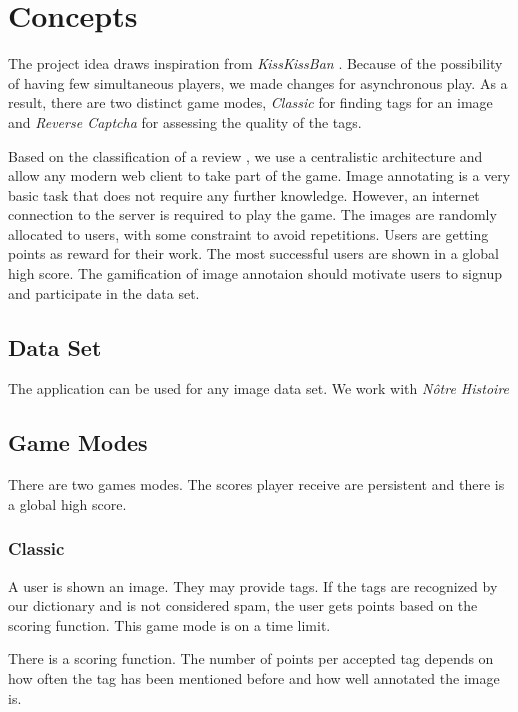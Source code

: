 \section{Concepts}
\label{g14:sec:concepts} %

The project idea draws inspiration from \textit{KissKissBan} \cite{10.1145/1600150.1600153}.
Because of the possibility of having few simultaneous players, we made changes for asynchronous play. As a result, there are two distinct game modes, \emph{Classic} for finding tags for an image and \emph{Reverse Captcha} for assessing the quality of the tags.

Based on the classification of a review \cite{8566148}, we use a centralistic architecture and allow any modern web client to take part of the game. Image annotating is a very basic task that does not require any further knowledge. However, an internet connection to the server is required to play the game. The images are randomly allocated to users, with some constraint to avoid repetitions.
Users are getting points as reward for their work. The most successful users are shown in a global high score. The gamification of image annotaion should motivate users to signup and participate in the data set.


\subsection{Data Set}
\label{g14:sec:concepts:dataset}
The application can be used for any image data set. We work with \textit{Nôtre Histoire}

\subsection{Game Modes}
\label{g14:sec:concepts:gamemodes}

There are two games modes. The scores player receive are persistent and there is a global high score. 

\subsubsection{Classic}
\label{g14:sec:concepts:gamemodes:classic}
A user is shown an image. They may provide tags. If the tags are recognized by our dictionary and is not considered spam, the user gets points based on the scoring function.
This game mode is on a time limit.

There is a scoring function. The number of points per accepted tag depends on how often the tag has been mentioned before and how well annotated the image is.

